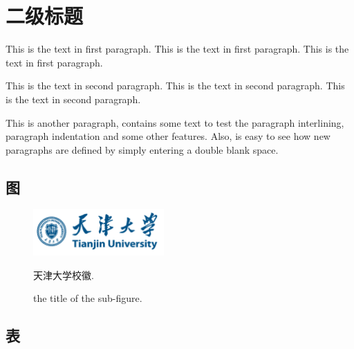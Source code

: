 
\section{二级标题}
This is the text in first paragraph. This is the text in first 
paragraph. This is the text in first paragraph. \par
This is the text in second paragraph. This is the text in second 
paragraph. This is the text in second paragraph.

This is another paragraph, contains some text to test the paragraph
interlining, paragraph indentation and some other features. Also, 
is easy to see how new paragraphs are defined by simply entering a 
double blank space.


\subsection{图}


\begin{figure}[!htp]
    \begin{center}
        \includegraphics[width=5cm]{fig/天津大学logo.jpeg}
    \end{center}
    \vspace{-2em}
    \caption{天津大学校徽.}
    \vspace{-1em}
    \addtocounter{figure}{-1}
    \renewcommand{\figurename}{Fig.}    
    \caption{the title of the sub-figure.} 

\end{figure}

\newpage

\subsection{表}

